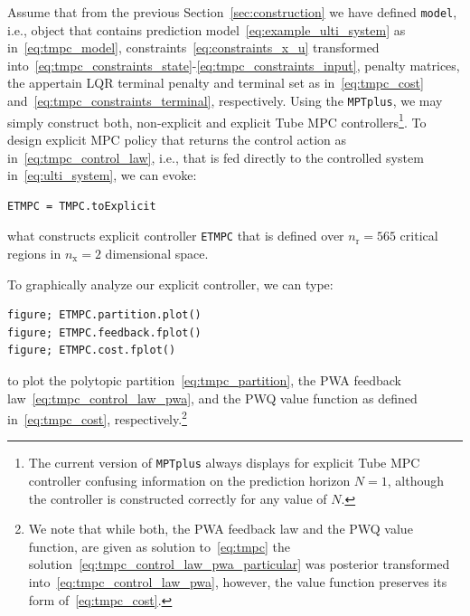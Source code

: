 \documentclass[letterpaper, 10 pt, conference]{ieeeconf}
\begin{document}
Assume that from the previous Section~\ref{sec:construction} we have defined \verb|model|, i.e., object that contains prediction model~\eqref{eq:example_ulti_system} as in~\eqref{eq:tmpc_model}, constraints~\eqref{eq:constraints_x_u} transformed into~\eqref{eq:tmpc_constraints_state}-\eqref{eq:tmpc_constraints_input}, penalty matrices, the appertain LQR terminal penalty and terminal set as in~\eqref{eq:tmpc_cost} and~\eqref{eq:tmpc_constraints_terminal}, respectively. 
%
Using the \texttt{MPTplus}, we may simply construct both, non-explicit and explicit Tube MPC controllers\footnote{The current version of \texttt{MPTplus} always displays for explicit Tube MPC controller confusing information on the prediction horizon $N=1$, although the controller is constructed correctly for any value of $N$.}. To design explicit MPC policy that returns the control action as in~\eqref{eq:tmpc_control_law}, i.e., that is fed directly to the controlled system in~\eqref{eq:ulti_system}, we can evoke:
\begin{lstlisting}[style=Matlab-editor]
ETMPC = TMPC.toExplicit
\end{lstlisting}
what constructs explicit controller \verb|ETMPC| that is defined over $n_\text{r} = 565$ critical regions in $n_\text{x} = 2$ dimensional space.

To graphically analyze our explicit controller, we can type:
\begin{lstlisting}[style=Matlab-editor]
figure; ETMPC.partition.plot()
figure; ETMPC.feedback.fplot()
figure; ETMPC.cost.fplot()
\end{lstlisting}
to plot the polytopic partition~\eqref{eq:tmpc_partition}, the PWA feedback law~\eqref{eq:tmpc_control_law_pwa}, and the PWQ value function as defined in~\eqref{eq:tmpc_cost}, respectively.\footnote{We note that while both, the PWA feedback law and the PWQ value function, are given as solution to~\eqref{eq:tmpc} the solution~\eqref{eq:tmpc_control_law_pwa_particular} was posterior transformed into~\eqref{eq:tmpc_control_law_pwa}, however, the value function preserves its form of~\eqref{eq:tmpc_cost}.}
\end{document}
